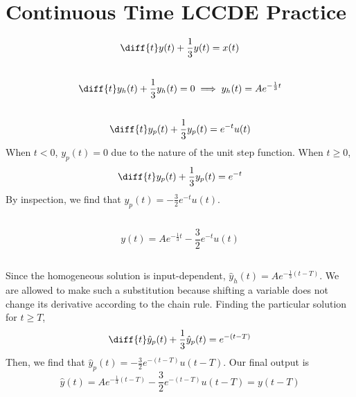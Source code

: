 \documentclass{article}
\begin{document}
\section{Continuous Time LCCDE Practice}

\begin{equation}
    \diff{t} y(t) + \frac{1}{3} y(t) = x(t)
\end{equation}

\subsection{}

\begin{equation}
    \diff{t} y_h(t) + \frac{1}{3} y_h(t) = 0 \implies y_h(t) = A e^{-\frac{1}{3} t}
\end{equation}

\subsection{}

\begin{equation}
    \diff{t} y_p(t) + \frac{1}{3} y_p(t) = e^{-t} u(t)
\end{equation}
When \(t < 0\), \(y_p(t) = 0\) due to the nature of the unit step function.
When \(t \geqslant 0\),
\begin{equation}
    \diff{t} y_p(t) + \frac{1}{3} y_p(t) = e^{-t}
\end{equation}
By inspection, we find that \(y_p(t) = -\frac{3}{2} e^{-t} u(t)\).

\subsection{}

\begin{equation}
    y(t) = A e^{-\frac{1}{3}t} - \frac{3}{2} e^{-t} u(t)
\end{equation}

\subsection{}

Since the homogeneous solution is input-dependent, \(\hat{y}_h(t) = A e^{-\frac{1}{3} (t - T)}\).
We are allowed to make such a substitution because shifting a variable does not change its derivative according to the chain rule.
Finding the particular solution for \(t \geqslant T\),
\begin{equation}
    \diff{t} \hat{y}_p(t) + \frac{1}{3} \hat{y}_p(t) = e^{-(t - T)}
\end{equation}
Then, we find that \(\hat{y}_p(t) = -\frac{3}{2} e^{-(t - T)} u(t - T)\).
Our final output is
\begin{equation}
    \hat{y}(t) = A e^{-\frac{1}{3}(t - T)} - \frac{3}{2} e^{-(t - T)} u(t - T) = y(t - T)
\end{equation}
\end{document}
